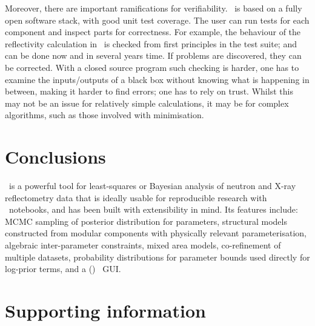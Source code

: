 \documentclass[pdf,preprint]{iucr}
\begin{document}
Moreover, there are important ramifications for verifiability. \ is based on a fully open software stack, with good unit test coverage. The user can run tests for each component and inspect parts for correctness. For example, the behaviour of the reflectivity calculation in \ is checked from first principles in the test suite; and can be done now and in several years time. If problems are discovered, they can be corrected. With a closed source program such checking is harder, one has to examine the inputs/outputs of a black box without knowing what is happening in between, making it harder to find errors; one has to rely on trust. Whilst this may not be an issue for relatively simple calculations, it may be for complex algorithms, such as those involved with minimisation.

\section{Conclusions}\label{conclusions}

\ is a powerful tool for least-squares or Bayesian analysis of neutron and X-ray reflectometry data that is ideally usable for reproducible research with \Jupyter\ notebooks, and has been built with extensibility in mind. Its features include: MCMC sampling of posterior distribution for parameters, structural models constructed from modular components with physically relevant parameterisation, algebraic inter-parameter constraints, mixed area models, co-refinement of multiple datasets, probability distributions for parameter bounds used directly for log-prior terms, and a (\Jupyter) \ipywidgets\ GUI.


\section{Supporting information}
\end{document}

